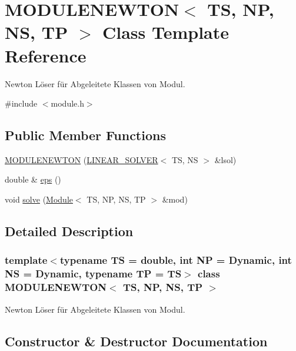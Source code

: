 \hypertarget{class_m_o_d_u_l_e_n_e_w_t_o_n}{}\section{M\+O\+D\+U\+L\+E\+N\+E\+W\+T\+ON$<$ TS, NP, NS, TP $>$ Class Template Reference}
\label{class_m_o_d_u_l_e_n_e_w_t_o_n}


Newton Löser für Abgeleitete Klassen von Modul.  




{\ttfamily \#include $<$module.\+h$>$}

\subsection*{Public Member Functions}
\begin{DoxyCompactItemize}
\item 
\mbox{\hyperlink{class_m_o_d_u_l_e_n_e_w_t_o_n_aa2e0aeb40d8313bfcac5803cb18b5a45}{M\+O\+D\+U\+L\+E\+N\+E\+W\+T\+ON}} (\mbox{\hyperlink{class_l_i_n_e_a_r___s_o_l_v_e_r}{L\+I\+N\+E\+A\+R\+\_\+\+S\+O\+L\+V\+ER}}$<$ TS, NS $>$ \&lsol)
\item 
double \& \mbox{\hyperlink{class_m_o_d_u_l_e_n_e_w_t_o_n_a2df80239a016b8216c167bfe026e76b4}{eps}} ()
\item 
void \mbox{\hyperlink{class_m_o_d_u_l_e_n_e_w_t_o_n_a8c3da4880abb18ae9e99854c21335e20}{solve}} (\mbox{\hyperlink{class_module}{Module}}$<$ TS, NP, NS, TP $>$ \&mod)
\end{DoxyCompactItemize}


\subsection{Detailed Description}
\subsubsection*{template$<$typename TS = double, int NP = Dynamic, int NS = Dynamic, typename TP = TS$>$\newline
class M\+O\+D\+U\+L\+E\+N\+E\+W\+T\+O\+N$<$ T\+S, N\+P, N\+S, T\+P $>$}

Newton Löser für Abgeleitete Klassen von Modul. 

\subsection{Constructor \& Destructor Documentation}
\mbox{\label{class_m_o_d_u_l_e_n_e_w_t_o_n_aa2e0aeb40d8313bfcac5803cb18b5a45}} 
